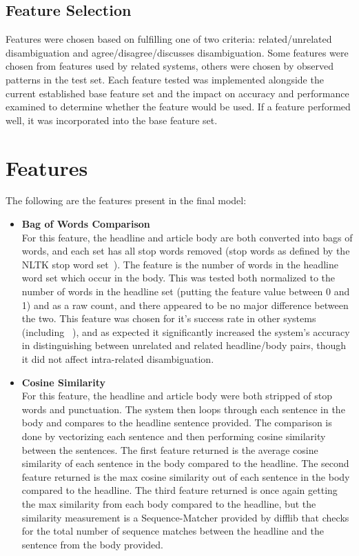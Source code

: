 \documentclass[11pt,a4paper]{article}
\begin{document}
\subsection{Feature Selection}
Features were chosen based on fulfilling one of two criteria: related/unrelated disambiguation and agree/disagree/discusses disambiguation. Some features were chosen from features used by related systems, others were chosen by observed patterns in the test set. Each feature tested was implemented alongside the current established base feature set and the impact on accuracy and performance examined to determine whether the feature would be used. If a feature performed well, it was incorporated into the base feature set.
\section{Features}
The following are the features present in the final model:
\begin{itemize}
  \item \textbf{Bag of Words Comparison}\\For this feature, the headline and article body are both converted into bags of words, and each set has all stop words removed (stop words as defined by the NLTK stop word set~\cite{Bird2004}). The feature is the number of words in the headline word set which occur in the body. This was tested both normalized to the number of words in the headline set (putting the feature value between 0 and 1) and as a raw count, and there appeared to be no major difference between the two. This feature was chosen for it's success rate in other systems (including ~\cite{ferreira2016emergent}), and as expected it significantly increased the system's accuracy in distinguishing between unrelated and related headline/body pairs, though it did not affect intra-related disambiguation.
 \item \textbf{Cosine Similarity}\\For this feature, the headline and article body were both stripped of stop words and punctuation. The system then loops through each sentence in the body and compares to the headline sentence provided. The comparison is done by vectorizing each sentence and then performing cosine similarity between the sentences. The first feature returned is the average cosine similarity of each sentence in the body compared to the headline. The second feature returned is the max cosine similarity out of each sentence in the body compared to the headline. The third feature returned is once again getting the max similarity from each body compared to the headline, but the similarity measurement is a Sequence-Matcher provided by difflib that checks for the total number of sequence matches between the headline and the sentence from the body provided. 
\end{itemize}
\end{document}
